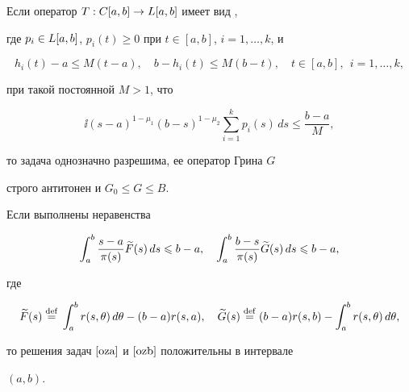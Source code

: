 \begin{cor}\label{s1}


Если оператор $T:C[a,b]\to L[a,b]$ имеет вид ,


где $p_i\in L[a,b]$, $p_i(t)\ge0$ при $t\in[a,b]$, $i=1,\dotsc,k$, и


$$


h_i(t)-a\le M(t-a),\quad b-h_i(t)\le M(b-t),\quad


t\in[a,b],\ \ i=1,\dotsc,k,


$$


при такой постоянной $M>1$, что


$$


\ii(s-a)^{1-\mu_1}(b-s)^{1-\mu_2}\sum_{i=1}^kp_i(s)\,ds\le\frac{b-a}{M},


$$


то задача  однозначно разрешима, ее оператор Грина $G$


строго антитонен и $G_0\le G\le B$.


\end{cor}





\begin{thm}\label{t3}


Если выполнены неравенства


$$


\int_a^b\frac{s-a}{\pi(s)}\w F(s)\,ds\le b-a,\quad


\int_a^b\frac{b-s}{\pi(s)}\w G(s)\,ds\le b-a,


$$


где


$$


\w F(s)\eqdef\ii r(s,\te)\,d\te-(b-a)r(s,a),\quad


\w G(s)\eqdef (b-a)r(s,b)-\ii r(s,\te)\,d\te,


$$


то решения задач $\eqref{oza}$ и $\eqref{ozb}$ положительны в интервале


$(a,b)$.


\end{thm}





